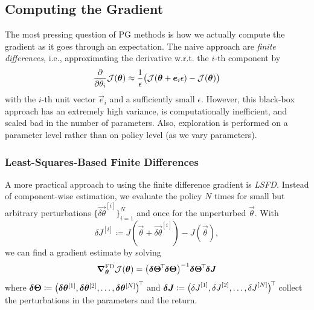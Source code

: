		\subsection{Computing the Gradient}
			The most pressing question of \ac{PG} methods is how we actually compute the gradient as it goes through an expectation. The naive approach are \emph{finite differences,} i.e., approximating the derivative w.r.t. the \(i\)-th component by
			\begin{equation}
				\pdv{\theta_i} \mathcal{J}(\bm{\theta}) \approx \frac{1}{\epsilon} \bigl( \mathcal{J}(\bm{\theta} + \bm{e}_i \epsilon) - \mathcal{J}(\bm{\theta}) \bigr)
			\end{equation}
			with the \(i\)-th unit vector \(\vec{e}_i\) and a sufficiently small \(\epsilon\). However, this black-box approach has an extremely high variance, is computationally inefficient, and scaled bad in the number of parameters. Also, exploration is performed on a parameter level rather than on policy level (as we vary parameters).

			\subsubsection{Least-Squares-Based Finite Differences}
				A more practical approach to using the finite difference gradient is \emph{\ac{LSFD}.} Instead of component-wise estimation, we evaluate the policy \(N\) times for small but arbitrary perturbations \( \{ \vec{\delta\theta}^{[i]} \}_{i = 1}^{N} \) and once for the unperturbed \(\vec{\theta}\). With
				\begin{equation}
					{\delta J}^{[i]} \coloneqq J(\vec{\theta} + \vec{\delta\theta}^{[i]}) - J(\vec{\theta}),
				\end{equation}
				we can find a gradient estimate by solving
				\begin{equation}
					\grad_{\bm{\theta}}^\mathrm{FD} \mathcal{J}(\bm{\theta}) = \bigl( \bm{\delta\Theta}^{\!\top\!} \bm{\delta\Theta} \bigr)^{-1} \bm{\delta\Theta}^{\!\top\!} \bm{\delta J}  \label{eq:lsfd}
				\end{equation}
				where \( \bm{\delta\Theta} \coloneqq \bigl( \bm{\delta\theta}^{[1]}, \bm{\delta\theta}^{[2]}, \dots, \bm{\delta\theta}^{[N]} \bigr)^{\!\top\!} \) and \( \bm{\delta J} \coloneqq \bigl( {\delta J}^{[1]}, {\delta J}^{[2]}, \dots, {\delta J}^{[N]} \bigr)^{\!\top\!} \) collect the perturbations in the parameters and the return.

